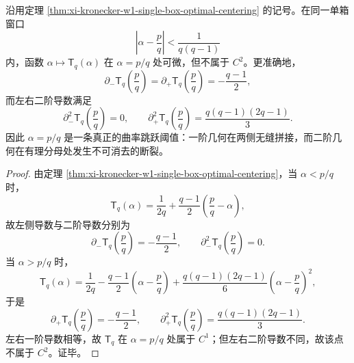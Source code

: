 \begin{theorem}\label{thm:xi-kronecker-w1-rational-threshold-c1-nonc2-cusp}
沿用定理 \ref{thm:xi-kronecker-w1-single-box-optimal-centering} 的记号。在同一单箱窗口
\[
\left|\alpha-\frac pq\right|<\frac{1}{q(q-1)}
\]
内，函数 \(\alpha\mapsto \mathsf{T}_q(\alpha)\) 在 \(\alpha=p/q\) 处可微，但不属于 \(C^2\)。更准确地，
\[
\partial_-\mathsf{T}_q\!\left(\frac pq\right)
=
\partial_+\mathsf{T}_q\!\left(\frac pq\right)
=
-\frac{q-1}{2},
\]
而左右二阶导数满足
\[
\partial_-^2\mathsf{T}_q\!\left(\frac pq\right)=0,
\qquad
\partial_+^2\mathsf{T}_q\!\left(\frac pq\right)=\frac{q(q-1)(2q-1)}{3}.
\]
因此 \(\alpha=p/q\) 是一条真正的曲率跳跃阈值：一阶几何在两侧无缝拼接，而二阶几何在有理分母处发生不可消去的断裂。
\end{theorem}
\begin{proof}
由定理 \ref{thm:xi-kronecker-w1-single-box-optimal-centering}，当
\(\alpha<p/q\) 时，
\[
\mathsf{T}_q(\alpha)=\frac{1}{2q}+\frac{q-1}{2}\left(\frac pq-\alpha\right),
\]
故左侧导数与二阶导数分别为
\[
\partial_-\mathsf{T}_q\!\left(\frac pq\right)=-\frac{q-1}{2},
\qquad
\partial_-^2\mathsf{T}_q\!\left(\frac pq\right)=0.
\]
当 \(\alpha>p/q\) 时，
\[
\mathsf{T}_q(\alpha)
=
\frac{1}{2q}
-\frac{q-1}{2}\left(\alpha-\frac pq\right)
+\frac{q(q-1)(2q-1)}{6}\left(\alpha-\frac pq\right)^2,
\]
于是
\[
\partial_+\mathsf{T}_q\!\left(\frac pq\right)=-\frac{q-1}{2},
\qquad
\partial_+^2\mathsf{T}_q\!\left(\frac pq\right)=\frac{q(q-1)(2q-1)}{3}.
\]
左右一阶导数相等，故 \(\mathsf{T}_q\) 在 \(\alpha=p/q\) 处属于 \(C^1\)；但左右二阶导数不同，故该点不属于 \(C^2\)。证毕。
\end{proof}

\endinput
